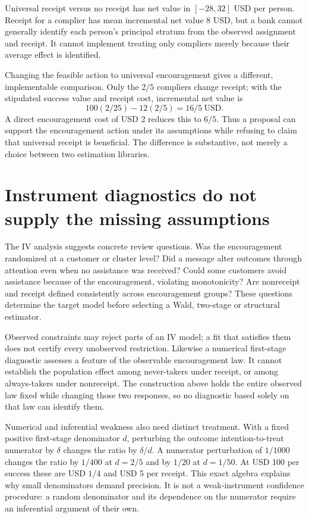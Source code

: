 Universal receipt versus no receipt has net value
in $[-28,32]$ USD per person. Receipt for a complier has mean
incremental net value $8$ USD, but a bank cannot generally
identify each person's principal stratum from the observed
assignment and receipt. It cannot implement treating only
compliers merely because their average effect is
identified.~\citep{angrist1996,exec17_s3_exact}

Changing the feasible action to universal encouragement gives
a different, implementable comparison. Only the $2/5$ compliers
change receipt; with the stipulated success value and receipt
cost, incremental net value is
\[
 100(2/25)-12(2/5)=16/5\ \text{USD}.
\]
A direct encouragement cost of USD 2 reduces this to $6/5$.
Thus a proposal can support the encouragement action under its
assumptions while refusing to claim that universal receipt is
beneficial. The difference is substantive, not merely a choice
between two estimation libraries.

\section{Instrument diagnostics do not supply the missing assumptions}

The IV analysis suggests concrete review questions. Was the
encouragement randomized at a customer or cluster level? Did a
message alter outcomes through attention even when no assistance
was received? Could some customers avoid assistance because of
the encouragement, violating monotonicity? Are nonreceipt and
receipt defined consistently across encouragement groups? These
questions determine the target model before selecting a Wald,
two-stage or structural estimator.

Observed constraints may reject parts of an IV model; a fit that
satisfies them does not certify every unobserved restriction.
Likewise a numerical first-stage diagnostic assesses a feature
of the observable encouragement law. It cannot establish the
population effect among never-takers under receipt, or among
always-takers under nonreceipt. The construction above holds
the entire observed law fixed while changing those two
responses, so no diagnostic based solely on that law can
identify them.~\citep{angrist1996,exec17_s3_exact}

Numerical and inferential weakness also need distinct treatment.
With a fixed positive first-stage denominator $d$, perturbing
the outcome intention-to-treat numerator by $\delta$ changes
the ratio by $\delta/d$. A numerator perturbation of $1/1000$
changes the ratio by $1/400$ at $d=2/5$ and by $1/20$ at
$d=1/50$. At USD 100 per success these are USD $1/4$ and
USD 5 per receipt. This exact algebra explains why small
denominators demand precision. It is not a weak-instrument
confidence procedure: a random denominator and its dependence
on the numerator require an inferential argument of their
own.~\citep{exec17_s3_exact}

